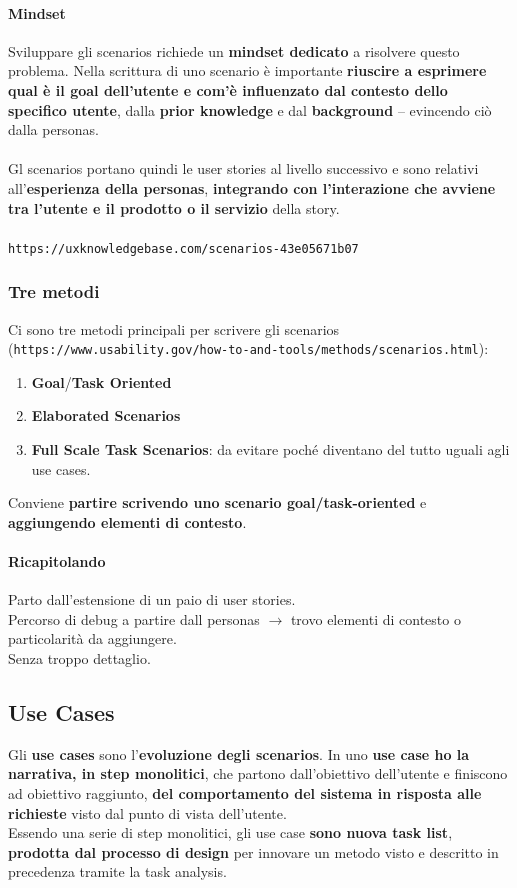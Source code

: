 \documentclass[10pt]{article}
\begin{document}
\paragraph{Mindset} Sviluppare gli scenarios richiede un \textbf{mindset dedicato} a risolvere questo problema. Nella scrittura di uno scenario è importante \textbf{riuscire a esprimere qual è il goal dell'utente e com'è influenzato dal contesto dello specifico utente}, dalla \textbf{prior knowledge} e dal \textbf{background} -- evincendo ciò dalla personas.\\\\
Gl scenarios portano quindi le user stories al livello successivo e sono relativi all'\textbf{esperienza della personas}, \textbf{integrando con l'interazione che avviene tra l'utente e il prodotto o il servizio} della story.\\\\
\texttt{https://uxknowledgebase.com/scenarios-43e05671b07}
\subsubsection{Tre metodi} Ci sono tre metodi principali per scrivere gli scenarios\\(\texttt{https://www.usability.gov/how-to-and-tools/methods/scenarios.html}):
\begin{enumerate}
\item \textbf{Goal}/\textbf{Task Oriented}
\item \textbf{Elaborated Scenarios}
\item \textbf{Full Scale Task Scenarios}: da evitare poché diventano del tutto uguali agli use cases.
\end{enumerate}
Conviene \textbf{partire scrivendo uno scenario goal/task-oriented} e \textbf{aggiungendo elementi di contesto}.
\paragraph{Ricapitolando} Parto dall'estensione di un paio di user stories.\\
Percorso di debug a partire dall personas $\rightarrow$ trovo elementi di contesto o particolarità da aggiungere.\\
Senza troppo dettaglio.
\subsection{Use Cases}
Gli \textbf{use cases} sono l'\textbf{evoluzione degli scenarios}. In uno \textbf{use case ho la narrativa, in step monolitici}, che partono dall'obiettivo dell'utente e finiscono ad obiettivo raggiunto, \textbf{del comportamento del sistema in risposta alle richieste} visto dal punto di vista dell'utente.\\
Essendo una serie di step monolitici, gli use case \textbf{sono nuova task list}, \textbf{prodotta dal processo di design} per innovare un metodo visto e descritto in precedenza tramite la task analysis.
\end{document}
